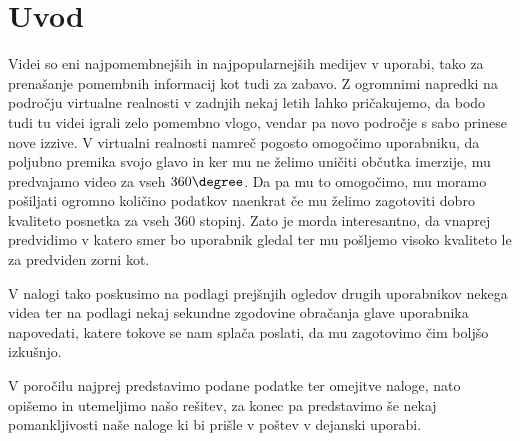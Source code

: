 \section{Uvod} 

Videi so eni najpomembnejših in najpopularnejših medijev v uporabi, tako za
prenašanje pomembnih informacij kot tudi za zabavo.  Z ogromnimi napredki na
področju virtualne realnosti v zadnjih nekaj letih lahko pričakujemo, da bodo
tudi tu videi igrali zelo pomembno vlogo, vendar pa novo področje s sabo
prinese nove izzive. V virtualni realnosti namreč pogosto omogočimo uporabniku,
da poljubno premika svojo glavo in ker mu ne želimo uničiti občutka imerzije,
mu predvajamo video za vseh $360\degree$. Da pa mu to omogočimo, mu
moramo pošiljati ogromno količino podatkov naenkrat če mu želimo zagotoviti
dobro kvaliteto posnetka za vseh $360$ stopinj. Zato je morda interesantno,
da vnaprej predvidimo v katero smer bo uporabnik gledal ter mu pošljemo visoko
kvaliteto le za predviden zorni kot.

V nalogi tako poskusimo na podlagi prejšnjih ogledov drugih uporabnikov nekega
videa ter na podlagi nekaj sekundne zgodovine obračanja glave uporabnika
napovedati, katere tokove se nam splača poslati, da mu zagotovimo čim boljšo
izkušnjo.

V poročilu najprej predstavimo podane podatke ter omejitve naloge, nato opišemo
in utemeljimo našo rešitev, za konec pa predstavimo še nekaj pomankljivosti
naše naloge ki bi prišle v poštev v dejanski uporabi.

